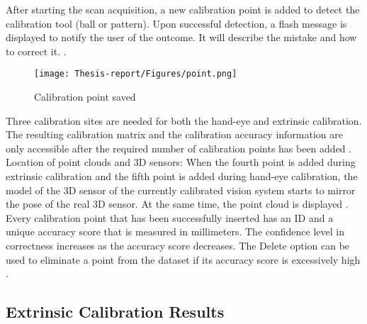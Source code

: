 \documentclass[12pt]{article}
\begin{document}
After starting the scan acquisition, a new calibration point is added to detect the calibration tool (ball or pattern).  Upon successful detection, a flash message is displayed to notify the user of the outcome. It will describe the mistake and how to correct it. \cite{ref2}.

\begin{figure}[h]
    \centering
    \texttt{[image: Thesis-report/Figures/point.png]}
    \caption{Calibration point saved \cite{ref2}}
    \label{fig:Photoneo Cmaera}
\end{figure} 

Three calibration sites are needed for both the hand-eye and extrinsic calibration. The resulting calibration matrix and the calibration accuracy information are only accessible after the required number of calibration points has been added \cite{ref2}.\\
 
 Location of point clouds and 3D sensors: When the fourth point is added during extrinsic calibration and the fifth point is added during hand-eye calibration, the model of the 3D sensor of the currently calibrated vision system starts to mirror the pose of the real 3D sensor.  At the same time, the point cloud is displayed \cite{ref2}.\\
 Every calibration point that has been successfully inserted has an ID and a unique accuracy score that is measured in millimeters.  The confidence level in correctness increases as the accuracy score decreases.  The Delete option can be used to eliminate a point from the dataset if its accuracy score is excessively high \cite{ref2}.

\subsection{Extrinsic Calibration Results}
\begin{table}[h!]
\centering


\label{tab:transformation_matrix}
\caption{Calibration Results}
\end{table}
\end{document}
